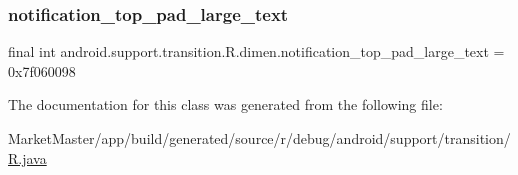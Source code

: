 \subsubsection{\texorpdfstring{notification\+\_\+top\+\_\+pad\+\_\+large\+\_\+text}{notification\_top\_pad\_large\_text}}
{\footnotesize\ttfamily final int android.\+support.\+transition.\+R.\+dimen.\+notification\+\_\+top\+\_\+pad\+\_\+large\+\_\+text = 0x7f060098\hspace{0.3cm}{\ttfamily [static]}}



The documentation for this class was generated from the following file\+:\begin{DoxyCompactItemize}
\item 
Market\+Master/app/build/generated/source/r/debug/android/support/transition/\mbox{\hyperlink{debug_2android_2support_2transition_2R_8java}{R.\+java}}\end{DoxyCompactItemize}
